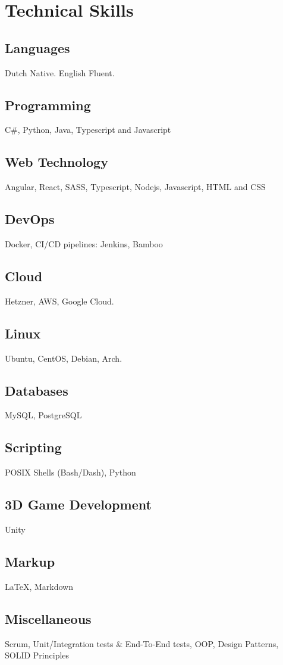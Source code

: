 \section{Technical Ski\textcolor{mycolor}{lls}}
  \subsection{Languages} 
  Dutch \textcolor{mycolor}{Native}. English \textcolor{mycolor}{Fluent}.
  \subsection{Programming}
    C\#, Python, Java, Typescript and Javascript
  \subsection{Web Technology}
    Angular, React, SASS, Typescript, Nodejs, Javascript, HTML and CSS
  \subsection{DevOps}
    Docker, CI/CD pipelines: Jenkins, Bamboo
  \subsection{Cloud}
    Hetzner, AWS, Google Cloud.
  \subsection{Linux}
    Ubuntu, CentOS, Debian, Arch.
  \subsection{Databases}
    MySQL, PostgreSQL
  \subsection{Scripting}
    POSIX Shells (Bash/Dash), Python
  \subsection{3D Game Development}
    Unity
  \subsection{Markup}
    {\LaTeX}, Markdown
  \subsection{Miscellaneous}
    Scrum, Unit/Integration tests \& End-To-End tests, OOP, Design Patterns, SOLID Principles